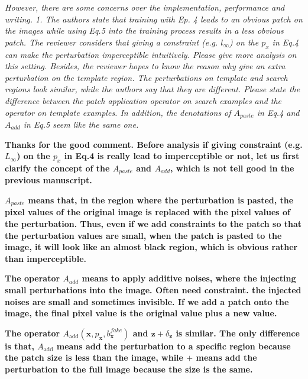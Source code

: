 \documentclass[12pt]{article}
\begin{document}
\textit{However, there are some concerns over the implementation, performance and writing. 1. The authors state that training with Ep. 4 leads to an obvious patch on the images while using Eq.5 into the training process results in a less obvious patch. The reviewer considers that giving a constraint (e.g. $l_{\infty}$) on the $p_x$ in Eq.4 can make the perturbation imperceptible intuitively. Please give more analysis on this setting.
Besides, the reviewer hopes to know the reason why give an extra perturbation on the template region. The perturbations on template and search regions look similar, while the authors say that they are different. Please state the difference between the patch application operator on search examples and the operator on template examples.
In addition, the denotations of $A_{paste}$ in Eq.4 and $A_{add}$ in Eq.5 seem like the same one.
}

\textbf{
Thanks for the good comment.
Before analysis if giving constraint (e.g. $L_{\infty}$) on the $p_x$ in Eq.4 is really lead to imperceptible or not, let us first clarify the concept of the $A_{paste}$ and $A_{add}$, which is not tell good in the previous manuscript.}

\textbf{%
$A_{paste}$ means that,
in the region where the perturbation is pasted, the pixel values of the original image is replaced with the pixel values of the perturbation.
Thus, even if we add constraints to the patch so that the perturbation values are small, when the patch is pasted to the image, it will look like an almost black region, which is obvious rather than imperceptible.
}

\textbf{
The operator $A_{add}$ means to apply additive noises, where the injecting small perturbations into the image. Often need constraint. the injected noises are small and sometimes invisible. If we add a patch onto the image, the final pixel value is the original value plus a new value.}

\textbf{The operator $A_{\text{add}}(\textbf{x}, p_\textbf{x}, b^{fake}_{\textbf{x}})$ and $\textbf{z} + \delta_\textbf{z}$ is similar. The only difference is that, $A_{\text{add}}$ means add the perturbation to a specific region because the patch size is less than the image, while $+$ means add the perturbation to the full image because the size is the same.}
\end{document}
